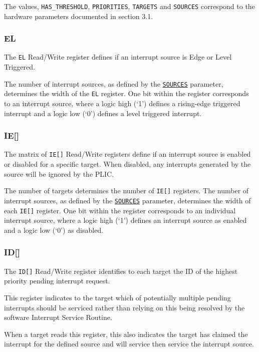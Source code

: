The values, \texttt{HAS\_THRESHOLD}, \texttt{PRIORITIES},
\texttt{TARGETS} and \texttt{SOURCES} correspond to the hardware
parameters documented in section 3.1.

\subsubsection{EL}

The \texttt{EL} Read/Write register defines if an interrupt source is
Edge or Level Triggered.

The number of interrupt sources, as defined by the
\protect\hyperlink{SOURCES}{\texttt{SOURCES}} parameter, determines
the width of the \texttt{EL} register. One bit within the register
corresponds to an interrupt source, where a logic high (`1') defines a
rising-edge triggered interrupt and a logic low (`0') defines a level
triggered interrupt.

\subsubsection{IE[]}

The matrix of \texttt{IE[]} Read/Write registers define if an
interrupt source is enabled or disabled for a specific target. When
disabled, any interrupts generated by the source will be ignored by the
PLIC.

The number of targets determines the number of \texttt{IE[]}
registers. The number of interrupt sources, as defined by the
\protect\hyperlink{SOURCES}{\texttt{SOURCES}} parameter, determines the
width of each \texttt{IE[]} register. One bit within the register
corresponds to an individual interrupt source, where a logic high (`1')
defines an interrupt source as enabled and a logic low (`0') as
disabled.

\subsubsection{ID[]}

The \texttt{ID[]} Read/Write register identifies to each target
the ID of the highest priority pending interrupt request.

This register indicates to the target which of potentially multiple
pending interrupts should be serviced rather than relying on this being
resolved by the software Interrupt Service Routine.

When a target reads this register, this also indicates the target has
claimed the interrupt for the defined source and will service then
service the interrupt source.


